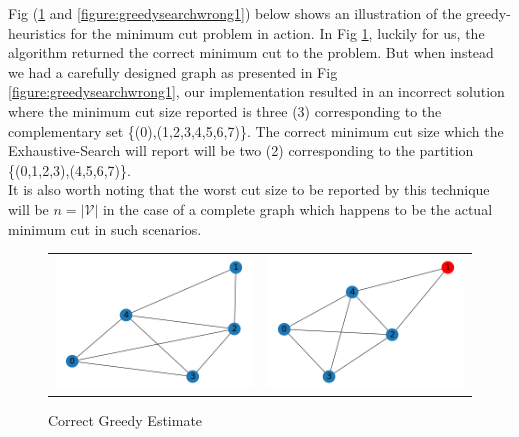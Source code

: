 \documentclass[longpaper, english, final, times]{revdetua}
\begin{document}
		Fig (\ref{figure:greedysearchcorrect1} and \ref{figure:greedysearchwrong1}) below shows an illustration of the greedy-heuristics for the minimum cut problem in action. In Fig \ref{figure:greedysearchcorrect1}, luckily for us, the algorithm returned the correct minimum cut to the problem. But when instead we  had a carefully designed graph as presented in Fig \ref{figure:greedysearchwrong1}, our implementation resulted in an incorrect solution where the minimum cut size reported is three (3) corresponding to the complementary set \{(0),(1,2,3,4,5,6,7)\}. The correct minimum cut size which the Exhaustive-Search will report will be two (2) corresponding to the partition \{(0,1,2,3),(4,5,6,7)\}.\\
		
		It is also worth noting that the worst cut size to be reported by this technique will be $n=|\mathcal{V}|$ in the case of a complete graph which happens to be the actual minimum cut in such scenarios.
		
		\begin{figure}[h]
			\begin{tabular}{cc}
				\includegraphics[width=0.5\linewidth]{imgs/greedyexx1.png} &   \includegraphics[width=0.5\linewidth]{imgs/greedyexx2.png} \\
			\end{tabular}
			\caption{Correct Greedy Estimate}
			\label{figure:greedysearchcorrect1}
		\end{figure}
			
\end{document}
